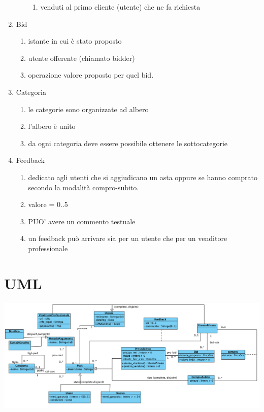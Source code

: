\documentclass{article}
\begin{document}
\begin{enumerate}[label=\arabic*.]
\begin{enumerate}[label=\arabic{enumi}.\arabic*.]
\begin{enumerate}[label=\arabic{enumi}.\arabic{enumii}.\arabic*.]
                        \item venduti al primo cliente (utente) che ne fa richiesta
                    \end{enumerate}
                \end{enumerate}
            \item Bid
                \begin{enumerate}[label=\arabic{enumi}.\arabic*.]
                    \item istante in cui è stato proposto
                    \item utente offerente (chiamato bidder)
                    \item operazione valore proposto per quel bid.
                \end{enumerate}
            \item Categoria
                \begin{enumerate}[label=\arabic{enumi}.\arabic*.]
                    \item le categorie sono organizzate ad albero
                    \item l'albero è unito
                    \item da ogni categoria deve essere possibile ottenere le sottocategorie
                \end{enumerate}
            \item Feedback
                \begin{enumerate}[label=\arabic{enumi}.\arabic*.]
                    \item dedicato agli utenti che si aggiudicano un asta oppure se hanno comprato secondo la modalità compro-subito.
                    \item valore = 0..5
                    \item PUO' avere un commento testuale
                    \item un feedback può arrivare sia per un utente che per un venditore professionale
                \end{enumerate}
        \end{enumerate}
    \section{UML}

    \includegraphics[width=\textwidth]{UML.png}
\end{document}
